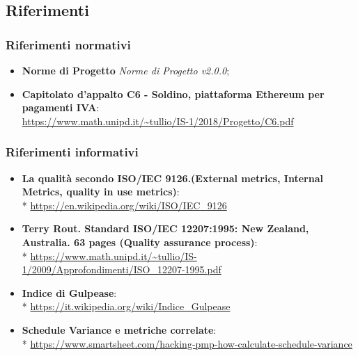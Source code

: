 \subsection{Riferimenti}
\subsubsection{Riferimenti normativi}
\begin{itemize}
\item \textbf{Norme di Progetto} \textit{Norme di Progetto v2.0.0};
\item \textbf{Capitolato d'appalto C6 - Soldino, piattaforma Ethereum per pagamenti IVA}: \\ \url{https://www.math.unipd.it/~tullio/IS-1/2018/Progetto/C6.pdf}
\end{itemize}
\subsubsection{Riferimenti informativi}
\begin{itemize}
\item \textbf{La qualità secondo ISO/IEC 9126.(External metrics, Internal Metrics, quality in use metrics)}: \\* \url{https://en.wikipedia.org/wiki/ISO/IEC_9126}
\item \textbf{Terry Rout. Standard ISO/IEC 12207:1995: New Zealand, Australia. 63 pages (Quality assurance process)}:\\*  
\url{https://www.math.unipd.it/~tullio/IS-1/2009/Approfondimenti/ISO\_12207-1995.pdf}
\item \textbf{Indice di Gulpease}: \\* \url{https://it.wikipedia.org/wiki/Indice_Gulpease}
\item \textbf{Schedule Variance e metriche correlate}:\\* \url{https://www.smartsheet.com/hacking-pmp-how-calculate-schedule-variance}
\end{itemize}